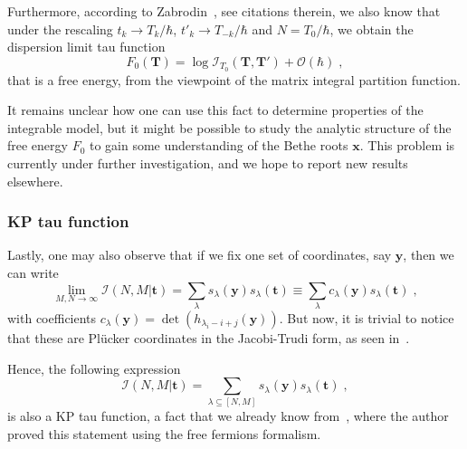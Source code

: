 \documentclass[a4paper,11pt]{amsart}
\begin{document}
Furthermore, according to Zabrodin~\cite{Zabrodin:2010ii}, see
citations therein, we also know that under the rescaling \(t_k \to
T_k/ \hbar\), \(t'_k \to T_{-k}/ \hbar\) and \(N = T_0/ \hbar\), we
obtain the dispersion limit tau function
\begin{equation}
  F_0(\bm{T}) = \log \mathcal{I}_{T_0}(\bm{T}, \bm{T}') + \mathcal{O}(\hbar)\; ,
\end{equation}
that is a free energy, from the viewpoint of the matrix integral
partition function.

It remains unclear how one can use this fact to determine properties
of the integrable model, but it might be possible to study the
analytic structure of the free energy \(F_0\) to gain some
understanding of the Bethe roots \(\bm{x}\). This problem is currently
under further investigation, and we hope to report new results
elsewhere.


\subsubsection{KP tau function}
Lastly, one may also observe that if we fix one set of coordinates,
say \(\bm{y}\), then we can write
\begin{equation}
 \lim_{M,N\to \infty}\mathcal{I}(N,M|\bm{t}) 
 = \sum_{\lambda} s_\lambda(\bm{y})  s_\lambda(\bm{t}) 
 \equiv \sum_{\lambda} c_\lambda(\bm{y})  s_\lambda(\bm{t}) \; ,
\end{equation}
with coefficients \(c_\lambda(\bm{y}) = \det (h_{\lambda_i-i
  +j}(\bm{y}))\). But now, it is trivial to notice that these are
Plücker coordinates in the Jacobi-Trudi form, as seen
in~\cite{Miwa2000, Alexandrov:2012tr}.

Hence, the following expression
\begin{equation}
 \mathcal{I}(N,M|\bm{t}) = \sum_{\lambda \subseteq [N,M]} s_\lambda(\bm{y})  s_\lambda(\bm{t}) \; ,
\end{equation}
is also a KP tau function, a fact that we already know
from~\cite{Wheeler:2010vmq}, where the author proved this statement
using the free fermions formalism.

\end{document}
